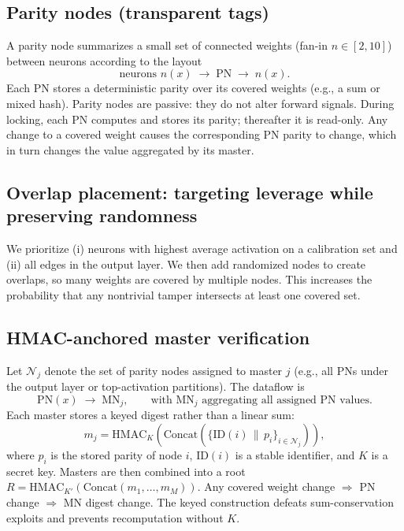 \documentclass[11pt]{article}
\begin{document}
\subsection{Parity nodes (transparent tags)}
A parity node summarizes a small set of connected weights (fan-in $n\in[2,10]$) between neurons according to the layout
\[\text{neurons } n(x) \;\longrightarrow\; \text{PN} \;\longrightarrow\; n(x).\]
Each PN stores a deterministic parity over its covered weights (e.g., a sum or mixed hash). Parity nodes are passive: they do not alter forward signals. During locking, each PN computes and stores its parity; thereafter it is read-only. Any change to a covered weight causes the corresponding PN parity to change, which in turn changes the value aggregated by its master.

\subsection{Overlap placement: targeting leverage while preserving randomness}
We prioritize (i) neurons with highest average activation on a calibration set and (ii) all edges in the output layer. We then add randomized nodes to create overlaps, so many weights are covered by multiple nodes. This increases the probability that any nontrivial tamper intersects at least one covered set.

\subsection{HMAC-anchored master verification}
Let $\mathcal{N}_j$ denote the set of parity nodes assigned to master $j$ (e.g., all PNs under the output layer or top-activation partitions). The dataflow is
\[\text{PN}(x) \;\longrightarrow\; \text{MN}_j, \qquad \text{with } \text{MN}_j \text{ aggregating all assigned PN values.}\]
Each master stores a keyed digest rather than a linear sum:
\begin{equation}
  m_j = \mathrm{HMAC}_{K}\!\left(\mathrm{Concat}\left(\{\mathrm{ID}(i)\,\|\,p_i\}_{i\in \mathcal{N}_j}\right)\right),
\end{equation}
where $p_i$ is the stored parity of node $i$, $\mathrm{ID}(i)$ is a stable identifier, and $K$ is a secret key. Masters are then combined into a root $R = \mathrm{HMAC}_{K'}(\mathrm{Concat}(m_1,\dots,m_M))$. Any covered weight change $\Rightarrow$ PN change $\Rightarrow$ MN digest change. The keyed construction defeats sum-conservation exploits and prevents recomputation without $K$.
\end{document}
